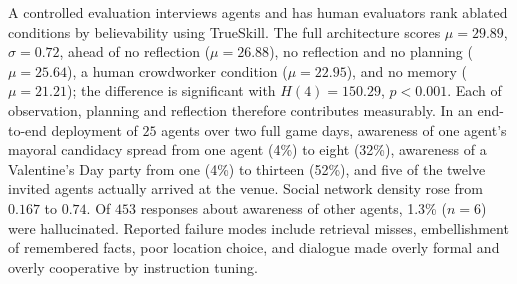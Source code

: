 A controlled evaluation interviews agents and has human evaluators rank ablated conditions by believability using TrueSkill. The full architecture scores $\mu=29.89$, $\sigma=0.72$, ahead of no reflection ($\mu=26.88$), no reflection and no planning ($\mu=25.64$), a human crowdworker condition ($\mu=22.95$), and no memory ($\mu=21.21$); the difference is significant with $H(4)=150.29$, $p<0.001$. Each of observation, planning and reflection therefore contributes measurably. In an end-to-end deployment of $25$ agents over two full game days, awareness of one agent's mayoral candidacy spread from one agent (4\%) to eight (32\%), awareness of a Valentine's Day party from one (4\%) to thirteen (52\%), and five of the twelve invited agents actually arrived at the venue. Social network density rose from $0.167$ to $0.74$. Of $453$ responses about awareness of other agents, 1.3\% ($n=6$) were hallucinated. Reported failure modes include retrieval misses, embellishment of remembered facts, poor location choice, and dialogue made overly formal and overly cooperative by instruction tuning.

